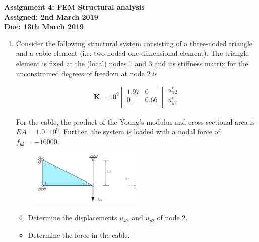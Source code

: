 \documentclass[a4paper,12pt]{article}
\begin{document}
\begin{centering}
	\textbf{
		Assignment 4: FEM Structural analysis\\
		Assigned: 2nd March 2019\\
		Due: 13th March 2019\\
	}
\end{centering}

\vspace{1em}
 
\begin{enumerate}

	\item Consider the following structural system consisting of a three-noded triangle and a cable
	element (i.e. two-noded one-dimensional element). The triangle element is fixed at the (local) nodes 1 and 3 and its stiffness matrix for the unconstrained degrees of freedom at node 2 is
	
		\begin{equation*}
			\mathbf{K} = 10^9 %
			\begin{bmatrix}
				1.97	& 0 \\ 
				0 & 0.66 \\
			\end{bmatrix}
			\begin{matrix}
				u_{x2}^e\\ 
				u_{y2}^e \\
			\end{matrix}	
		\end{equation*}
		
		For the cable, the product of the Young’s modulus and cross-sectional area is $EA = 1.0\cdot 10^9$.
		Further, the system is loaded with a nodal force of $f_{y2} = -10000$.
		
		\begin{figure}[!h]
			\centering
			\includegraphics[width=0.5\textwidth]{figs/2d-truss.png}
		\end{figure}
	
		\begin{itemize}
			\item Determine the displacements $u_{x2}$ and $u_{y2}$ of node 2.
			\item Determine the force in the cable.
		\end{itemize}
	

\end{enumerate}
\end{document}
